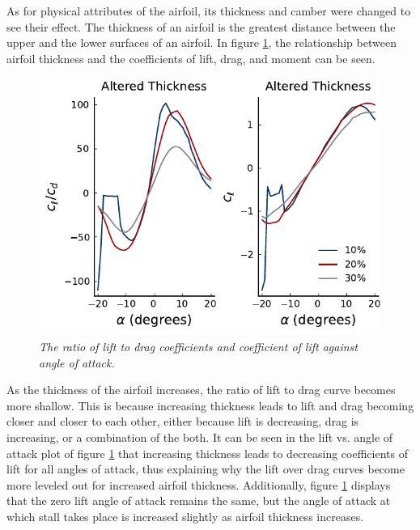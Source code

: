 \documentclass[journal]{new-aiaa}
\begin{document}
	As for physical attributes of the airfoil, its thickness and camber were changed to see their effect. The thickness of an airfoil is the greatest distance between the upper and the lower surfaces of an airfoil. In figure \ref{fig:altered-thickness}, the relationship between airfoil thickness and the coefficients of lift, drag, and moment can be seen.\\
	
	\begin{figure}[H]
		\centering
		\includegraphics{../graphics/altered-thickness.pdf}
		\caption{\emph{The ratio of lift to drag coefficients and coefficient of lift against angle of attack.}}
		\label{fig:altered-thickness}
	\end{figure}
	
	As the thickness of the airfoil increases, the ratio of lift to drag curve becomes more shallow. This is because increasing thickness leads to lift and drag becoming closer and closer to each other, either because lift is decreasing, drag is increasing, or a combination of the both. It can be seen in the lift vs. angle of attack plot of figure \ref{fig:altered-thickness} that increasing thickness leads to decreasing coefficients of lift for all angles of attack, thus explaining why the lift over drag curves become more leveled out for increased airfoil thickness. Additionally, figure \ref{fig:altered-thickness} displays that the zero lift angle of attack remains the same, but the angle of attack at which stall takes place is increased slightly as airfoil thickness increases.\\
	
\end{document}
